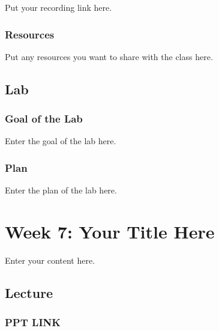 \documentclass[
  letterpaper,
  oneside]{book}
\numberwithin{equation}{section}
\numberwithin{figure}{section}
\theoremstyle{break}
\begin{document}

Put your recording link here.

\section*{Resources}\label{resources-5}


Put any resources you want to share with the class here.

\chapter*{Lab}\label{lab-5}


\section*{Goal of the Lab}\label{goal-of-the-lab-5}


Enter the goal of the lab here.

\section*{Plan}\label{plan-5}


Enter the plan of the lab here.

\part{Week 7: Your Title Here}

Enter your content here.

\chapter*{Lecture}\label{lecture-6}


\section*{PPT LINK}\label{ppt-link-6}
\end{document}
